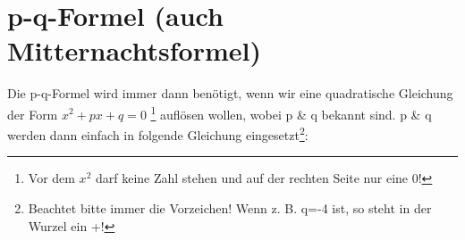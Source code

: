 \section{p-q-Formel (auch Mitternachtsformel)}
	Die p-q-Formel wird immer dann benötigt, wenn wir eine quadratische Gleichung
	der Form \(x^2 + p x + q = 0\) \footnote{Vor dem \(x^2\) darf keine Zahl stehen
	und auf der rechten Seite nur eine 0!} auflösen wollen, wobei p \& q bekannt
	sind. p \& q werden dann einfach in folgende Gleichung
	eingesetzt\footnote{Beachtet bitte immer die Vorzeichen! Wenn z. B. q=-4 ist,
	so steht in der Wurzel ein +!}:
	\formel{
		\[x_{1,2}=-\frac{p}{2}\pm \sqrt{\left ( \frac{p}{2} \right)^2-q}\]
	}

